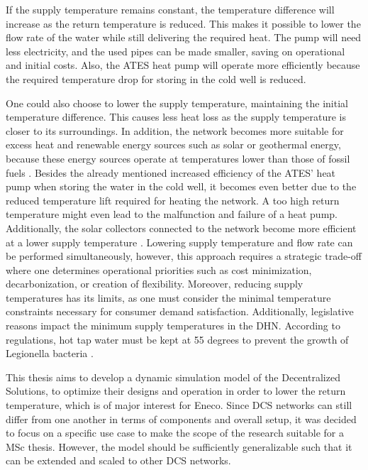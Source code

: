 If the supply temperature remains constant, the temperature difference will increase as the return temperature is reduced. This makes it possible to lower the flow rate of the water while still delivering the required heat. The pump will need less electricity, and the used pipes can be made smaller, saving on operational and initial costs. Also, the ATES heat pump will operate more efficiently because the required temperature drop for storing in the cold well is reduced.

One could also choose to lower the supply temperature, maintaining the initial temperature difference. This causes less heat loss as the supply temperature is closer to its surroundings. In addition, the network becomes more suitable for excess heat and renewable energy sources such as solar or geothermal energy, because these energy sources operate at temperatures lower than those of fossil fuels \cite{sustainableResources}. Besides the already mentioned increased efficiency of the ATES' heat pump when storing the water in the cold well, it becomes even better due to the reduced temperature lift required for heating the network. A too high return temperature might even lead to the malfunction and failure of a heat pump. Additionally, the solar collectors connected to the network become more efficient at a lower supply temperature \cite{booklowT}. Lowering supply temperature and flow rate can be performed simultaneously, however, this approach requires a strategic trade-off where one determines operational priorities such as cost minimization, decarbonization, or creation of flexibility. Moreover, reducing supply temperatures has its limits, as one must consider the minimal temperature constraints necessary for consumer demand satisfaction. Additionally, legislative reasons impact the minimum supply temperatures in the DHN. According to regulations, hot tap water must be kept at 55 degrees to prevent the growth of Legionella bacteria \cite{tapwaterWet}. 


This thesis aims to develop a dynamic simulation model of the Decentralized Solutions, to optimize their designs and operation in order to lower the return temperature, which is of major interest for Eneco. Since DCS networks can still differ from one another in terms of components and overall setup, it was decided to focus on a specific use case to make the scope of the research suitable for a MSc thesis. However, the model should be sufficiently generalizable such that it can be extended and scaled to other DCS networks.

